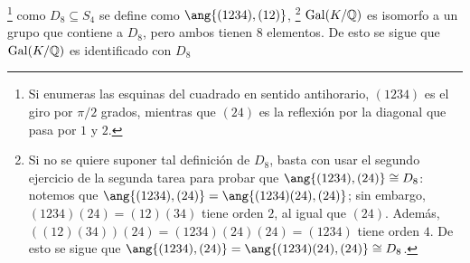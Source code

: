 \begin{sol}
\begin{enumerate}[label=\alph*)]
\footnote{
    Si enumeras las esquinas del cuadrado en sentido antihorario, $(1234)$ es el giro por $\pi/2$ grados, mientras que $(24)$ es la reflexión por la diagonal que pasa por $1$ y $2$.
} %
como $D_8 \subseteq S_4$ se define como $\ang{(1234),(12)}$,%
\footnote{
    Si no se quiere suponer tal definición de $D_8$, basta con usar el segundo ejercicio de la segunda tarea para probar que $\ang{(1234),(24)} \cong D_8$: notemos que $\ang{(1234),(24)} = \ang{(1234)(24),(24)}$; sin embargo, $(1234)(24)=(12)(34)$ tiene orden $2$, al igual que $(24)$. Además, $((12)(34))(24) = (1234)(24)(24) = (1234)$ tiene orden $4$. De esto se sigue que $\ang{(1234),(24)} = \ang{(1234)(24),(24)} \cong D_8$.
} %
$\operatorname{Gal}(K/\mathbb{Q})$ es isomorfo a un grupo que contiene a $D_8$, pero ambos tienen $8$ elementos. De esto se sigue que $\operatorname{Gal}(K/\mathbb{Q})$ es identificado con $D_8$


\end{enumerate}
\end{sol}
